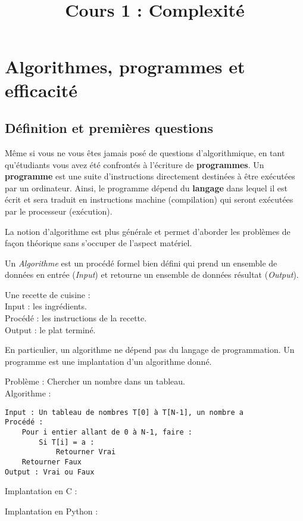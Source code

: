 \documentclass{../cours}
\title{Cours 1 : Complexité}
\begin{document}
\maketitle
 
 
\section{Algorithmes, programmes et efficacité}

\subsection{Définition et premières questions}

Même si vous ne vous êtes jamais posé de questions d'algorithmique, en tant qu'étudiants vous avez été confrontés à l'écriture de
\textbf{programmes}. Un \textbf{programme} est une suite d'instructions directement destinées à être exécutées par un ordinateur. Ainsi, 
le programme dépend du \textbf{langage} dans lequel il est écrit et sera traduit en instructions machine (compilation) qui seront exécutées par le processeur (exécution).

La notion d'algorithme est plus générale et permet d'aborder les problèmes de façon théorique sans s'occuper de l'aspect matériel.

\begin{Definition}
Un \emph{Algorithme} est un procédé formel bien défini qui prend un ensemble de données en entrée (\emph{Input}) et retourne un ensemble de données résultat (\emph{Output}).
\end{Definition}

\begin{Example}
Une recette de cuisine : \\
Input : les ingrédients. \\
Procédé : les instructions de la recette. \\
Output : le plat terminé. \\
\end{Example}

En particulier, un algorithme ne dépend pas du langage de programmation. Un programme est une implantation d'un algorithme donné. 

\begin{Example}
\label{ex:chercher-nb}
Problème : Chercher un nombre dans un tableau. \\
Algorithme :

\begin{lstlisting}
Input : Un tableau de nombres T[0] à T[N-1], un nombre a
Procédé :
    Pour i entier allant de 0 à N-1, faire :
        Si T[i] = a :
            Retourner Vrai
    Retourner Faux
Output : Vrai ou Faux
\end{lstlisting} 
Implantation en C :

 
Implantation en Python :



\end{Example}
\end{document}
